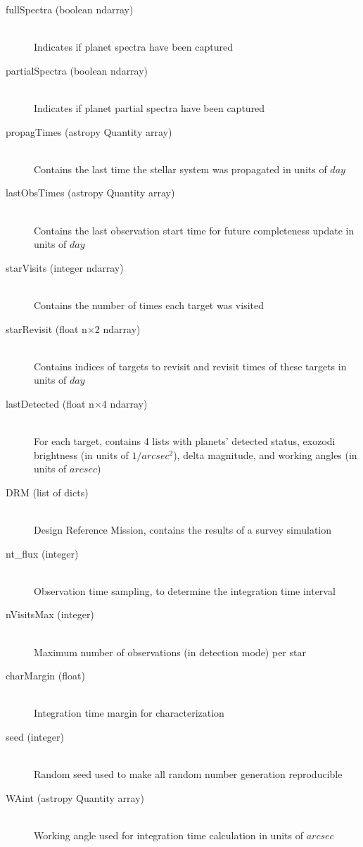 \documentclass[cleanfoot]{asme2ej}
\begin{document}
\begin{itemize}
\begin{description}
    \item[fullSpectra (boolean ndarray)] \hfill \\ Indicates if planet spectra have been captured
    \item[partialSpectra (boolean ndarray)] \hfill \\ Indicates if planet partial spectra have been captured
    \item[propagTimes (astropy Quantity array)] \hfill \\ Contains the last time the stellar system was propagated in units of $day$
    \item[lastObsTimes (astropy Quantity array)] \hfill \\ Contains the last observation start time for future completeness update in units of $day$
    \item[starVisits (integer ndarray)] \hfill \\ Contains the number of times each target was visited
    \item[starRevisit (float n$\times$2 ndarray)] \hfill \\ Contains indices of targets to revisit and revisit times of these targets in units of $day$
    \item[lastDetected (float n$\times$4 ndarray)] \hfill \\ For each target, contains 4 lists with planets' detected status, exozodi brightness (in units of $1/arcsec^2$), delta magnitude, and working angles (in units of $arcsec$)
    \item[DRM (list of dicts)] \hfill \\ Design Reference Mission, contains the results of a survey simulation
    \item[nt\_flux (integer)] \hfill \\ Observation time sampling, to determine the integration time interval
    \item[nVisitsMax (integer)] \hfill \\ Maximum number of observations (in detection mode) per star
    \item[charMargin (float)] \hfill \\ Integration time margin for characterization
    \item[seed (integer)] \hfill \\ Random seed used to make all random number generation reproducible
    \item[WAint (astropy Quantity array)] \hfill \\ Working angle used for integration time calculation in units of $arcsec$

\end{description}
\end{itemize}
\end{document}
